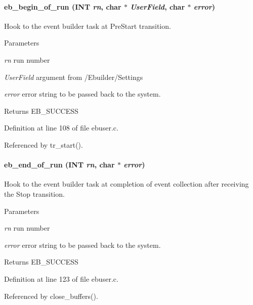 \paragraph[{eb\_\-begin\_\-of\_\-run}]{ eb\_\-begin\_\-of\_\-run ({\bf INT} {\em rn}, \/  char $\ast$ {\em UserField}, \/  char $\ast$ {\em error})}\hfill\label{ebuser_8c_aac338f16c26978fda836e729d5c6e366}
Hook to the event builder task at PreStart transition. 
\begin{DoxyParams}{Parameters}
\item[{\em rn}]run number \item[{\em UserField}]argument from /Ebuilder/Settings \item[{\em error}]error string to be passed back to the system. \end{DoxyParams}
\begin{DoxyReturn}{Returns}
EB\_\-SUCCESS 
\end{DoxyReturn}


Definition at line 108 of file ebuser.c.

Referenced by tr\_\-start().
\paragraph[{eb\_\-end\_\-of\_\-run}]{ eb\_\-end\_\-of\_\-run ({\bf INT} {\em rn}, \/  char $\ast$ {\em error})}\hfill\label{ebuser_8c_a98d66006b73521032c8d02040f6cf4b8}
Hook to the event builder task at completion of event collection after receiving the Stop transition. 
\begin{DoxyParams}{Parameters}
\item[{\em rn}]run number \item[{\em error}]error string to be passed back to the system. \end{DoxyParams}
\begin{DoxyReturn}{Returns}
EB\_\-SUCCESS 
\end{DoxyReturn}


Definition at line 123 of file ebuser.c.

Referenced by close\_\-buffers().
